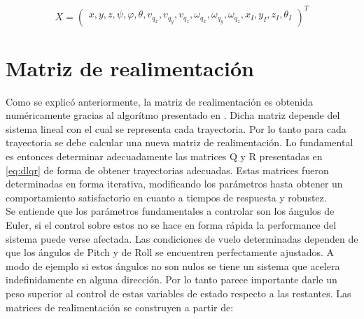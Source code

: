 \documentclass[main]{subfiles}
\begin{document}
\begin{equation}
\label{eq:controled}
X = \left(\begin{array}{c}
x,y,z,\psi,\varphi,\theta,v_{q_x},v_{q_y},v_{q_z},\omega_{q_x},\omega_{q_y},\omega_{q_z},x_I,y_I,z_I,\theta_I
\end{array}\right)^T
\end{equation}

\section{Matriz de realimentaci\'on}

Como se explic\'o anteriormente, la matriz de realimentaci\'on es obtenida num\'ericamente gracias al algor\'itmo presentado en \cite{bib:lqr-discreto}. Dicha matriz depende del sistema lineal con el cual se representa cada trayectoria. Por lo tanto para cada trayectoria se debe calcular una nueva matriz de realimentaci\'on. Lo fundamental es entonces determinar adecuadamente las matrices Q y R presentadas en \ref{eq:dlqr} de forma de obtener trayectorias adecuadas. Estas matrices fueron determinadas en forma iterativa, modificando los par\'ametros hasta obtener un comportamiento satisfactorio en cuanto a tiempos de respuesta y robustez.\\

Se entiende que los par\'ametros fundamentales a controlar son los \'angulos de Euler, si el control sobre estos no se hace en forma r\'apida la performance del sistema puede verse afectada.  Las condiciones de vuelo determinadas dependen de que los \'angulos de Pitch y de Roll se encuentren perfectamente ajustados. A modo de ejemplo si estos \'angulos no son nulos se tiene un sistema que acelera indefinidamente en alguna direcci\'on. Por lo tanto parece importante darle un peso superior al control de estas variables de estado respecto a las restantes. Las matrices de realimentaci\'on se construyen a partir de:
\end{document}
